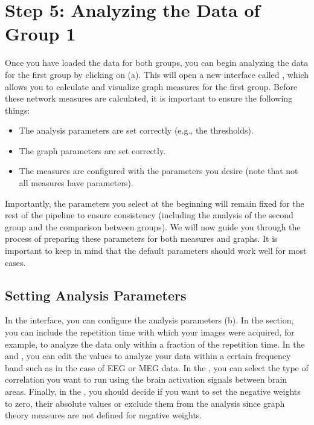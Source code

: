 \documentclass[justified]{tufte-handout}
\begin{document}
 
\clearpage

\section{Step 5: Analyzing the Data of Group 1}

Once you have loaded the data for both groups, you can begin analyzing the data for the first group by clicking on  (a). 
This will open a new interface called , which allows you to calculate and visualize graph measures for the first group. 
Before these network measures are calculated, it is important to ensure the following things: 
\begin{itemize}

\item The analysis parameters are set correctly (e.g., the thresholds).

\item The graph parameters are set correctly.

\item The measures are configured with the parameters you desire (note that not all measures have parameters).

\end{itemize}

Importantly, the parameters you select at the beginning will remain fixed for the rest of the pipeline to ensure consistency (including the analysis of the second group and the comparison between groups). We will now guide you through the process of preparing these parameters for both measures and graphs. It is important to keep in mind that the default parameters should work well for most cases.

\subsection{Setting Analysis Parameters}

In the  interface, you can configure the analysis parameters (b).
In the  section, you can include the repetition time with which your images were acquired, for example, to analyze the data only within a fraction of the repetition time.
In the  and , you can edit the values to analyze your data within a certain frequency band such as in the case of EEG or MEG data.
In the , you can select the type of correlation you want to run using the brain activation signals between brain areas. 
Finally, in the , you should decide if you want to set the negative weights to zero, their absolute values or exclude them from the analysis since graph theory measures are not defined for negative weights.
\end{document}
